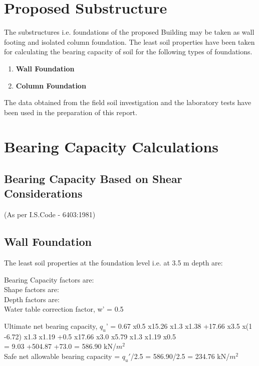 \documentclass{soil12}
\begin{document}
\section{Proposed Substructure}
The substructures i.e. foundations of the proposed Building may be taken as wall footing and isolated
column foundation. The least soil properties have been taken for calculating the bearing capacity of
soil for the following types of foundations.
\begin{enumerate}
\item{\large{\textbf{Wall Foundation}}}\\
\item{\large{\textbf{Column Foundation}}}\\
\end{enumerate}
The data obtained from the field soil investigation and the laboratory tests have been used in the
preparation of this report.
\section{Bearing Capacity Calculations}
\subsection{Bearing Capacity Based on Shear Considerations}
(As per I.S.Code - 6403:1981)
\subsection{Wall Foundation}

The least soil properties at the foundation level i.e. at 3.5 m depth are:\\

Bearing Capacity factors are:\\
Shape factors are:\\
Depth factors are:\\    
Water table correction factor, w' = 0.5

Ultimate net bearing capacity, $q_u$' = 0.67 x0.5 x15.26 x1.3 x1.38 +17.66 x3.5 x(1 -6.72) x1.3 x1.19 +0.5 x17.66 x3.0 x5.79 x1.3 x1.19 x0.5\\
= 9.03 +504.87 +73.0 = 586.90 kN/$m^2$ \\	
Safe net allowable bearing capacity = $q_u'$/2.5 = 586.90/2.5 = 234.76 kN/$m^2$
\end{document}
